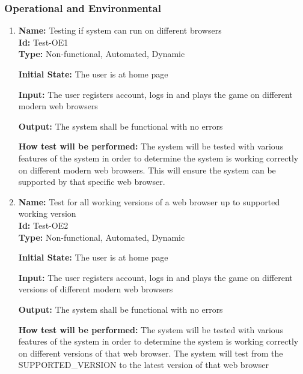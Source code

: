 \documentclass[12pt, titlepage]{article}
\begin{document}
\subsubsection{Operational and Environmental}
\begin{enumerate}
    \item{\textbf{Name: }Testing if system can run on different browsers\\} \label{Test-OE1}
    \textbf{Id: }Test-OE1\\
    
   \textbf{Type:} Non-functional, Automated, Dynamic
    					
    \textbf{Initial State:} The user is at home page
    					
   \textbf{Input:} The user registers account, logs in and plays the game on different modern web browsers
    					
   \textbf{Output: }The system shall be functional with no errors
    					
   \textbf{How test will be performed: }The system will be tested with various features of the system in order to determine the system is working correctly on different modern web browsers. This will ensure the system can be supported by that specific web browser.
    
    \item{\textbf{Name: }Test for all working versions of a web browser up to supported working version \\} \label{Test-OE2}
    \textbf{Id: }Test-OE2\\
    
    \textbf{Type:} Non-functional, Automated, Dynamic
    					
    \textbf{Initial State: }The user is at home page
    					
   \textbf{Input:} The user registers account, logs in and plays the game on different versions of different modern web browsers
    					
    \textbf{Output:} The system shall be functional with no errors
    					
    \textbf{How test will be performed:} The system will be tested with various features of the system in order to determine the system is working correctly on different versions of that web browser. The system will test from the SUPPORTED\_VERSION to the latest version of that web browser
\end{enumerate}
\end{document}
